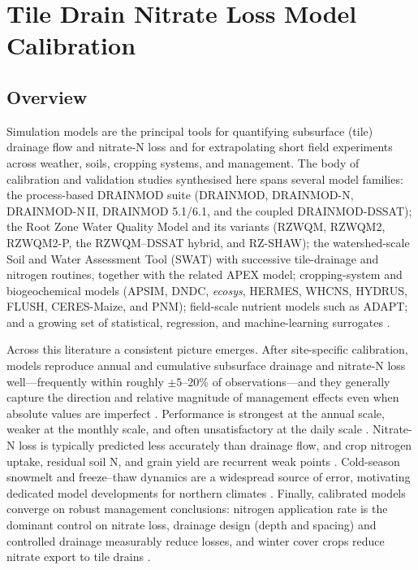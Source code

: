 \documentclass[11pt]{article}
\begin{document}
\section*{Tile Drain Nitrate Loss Model Calibration}

\subsection{Overview}

Simulation models are the principal tools for quantifying subsurface (tile) drainage flow and nitrate-N loss and for extrapolating short field experiments across weather, soils, cropping systems, and management. The body of calibration and validation studies synthesised here spans several model families: the process-based DRAINMOD suite (DRAINMOD, DRAINMOD-N, DRAINMOD-N\,II, DRAINMOD 5.1/6.1, and the coupled DRAINMOD-DSSAT); the Root Zone Water Quality Model and its variants (RZWQM, RZWQM2, RZWQM2-P, the RZWQM--DSSAT hybrid, and RZ-SHAW); the watershed-scale Soil and Water Assessment Tool (SWAT) with successive tile-drainage and nitrogen routines, together with the related APEX model; cropping-system and biogeochemical models (APSIM, DNDC, \textit{ecosys}, HERMES, WHCNS, HYDRUS, FLUSH, CERES-Maize, and PNM); field-scale nutrient models such as ADAPT; and a growing set of statistical, regression, and machine-learning surrogates \parencite{Ma2001,David2009,Luo2010,Fang2012,Negm2014,Smith2020}.

Across this literature a consistent picture emerges. After site-specific calibration, models reproduce annual and cumulative subsurface drainage and nitrate-N loss well---frequently within roughly $\pm5$--$20\%$ of observations---and they generally capture the direction and relative magnitude of management effects even when absolute values are imperfect \parencite{Feyereisen2007,Youssef2006,Singh2020b,Dayyani2010}. Performance is strongest at the annual scale, weaker at the monthly scale, and often unsatisfactory at the daily scale \parencite{Liang2018,Ikenberry2017,Marjerison2016,Ojeda2018}. Nitrate-N loss is typically predicted less accurately than drainage flow, and crop nitrogen uptake, residual soil N, and grain yield are recurrent weak points \parencite{Ma2007,Ahuja2007,Malone2007c}. Cold-season snowmelt and freeze--thaw dynamics are a widespread source of error, motivating dedicated model developments for northern climates \parencite{Wang2006c,Dayyani2010b,Yang2007,Salazar2009}. Finally, calibrated models converge on robust management conclusions: nitrogen application rate is the dominant control on nitrate loss, drainage design (depth and spacing) and controlled drainage measurably reduce losses, and winter cover crops reduce nitrate export to tile drains \parencite{Davis2000,Moriasi2013,Fang2012,Malone2017}.
\end{document}
